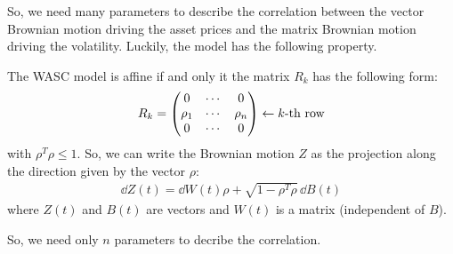  So, we need many parameters to describe the correlation between the vector Brownian motion driving the asset prices and the matrix Brownian motion driving the volatility. Luckily, the model has the following property.
\begin{proposition}
    The WASC model is affine if and only it the matrix $R_k$ has the following form:
    \begin{align}
        R_k = \mqty(0 & \cdots & 0 \\
                      \rho_1 & \cdots & \rho_n \\
                      0 & \cdots & 0) \leftarrow \text{$k$-th row}
    \end{align}
    with $\rho^T\rho \le 1$. So, we can write the Brownian motion $Z$ as the projection along the direction given by the vector $\rho$:
    \begin{align}
        \dd Z(t) = \dd W(t)\rho + \sqrt{1-\rho^T\rho}\,\dd B(t)
    \end{align}
    where $Z(t)$ and $B(t)$ are vectors and $W(t)$ is a matrix (independent of $B$).
\end{proposition}
So, we need only $n$ parameters to decribe the correlation.
